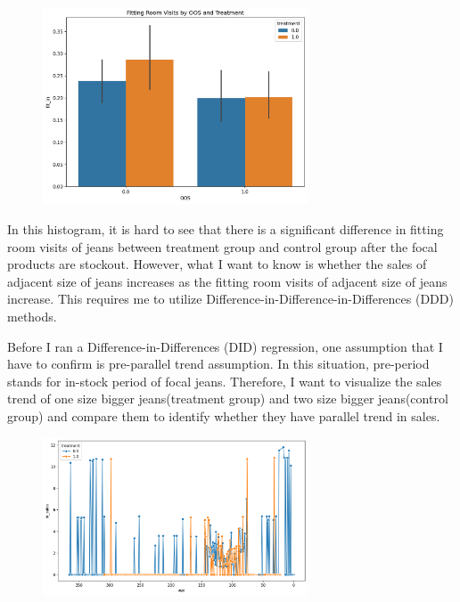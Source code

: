 \documentclass[letterpaper,12pt]{article}
\theoremstyle{definition}
\begin{document}
	\begin{figure}[H]
		\centering
		\includegraphics[width=0.7\textwidth]{images/Fittingroomvisits.png}
		\caption{}
		\label{Fittingroom visits}
	\end{figure}
	
	In this histogram, it is hard to see that there is a significant difference in fitting room visits of jeans between treatment group and control group after the focal products are stockout. However, what I want to know is whether the sales of adjacent size of jeans increases as the fitting room visits of adjacent size of jeans increase. This requires me to utilize Difference-in-Difference-in-Differences (DDD) methods.
	
	Before I ran a Difference-in-Differences (DID) regression, one assumption that I have to confirm is pre-parallel trend assumption. In this situation, pre-period stands for in-stock period of focal jeans. Therefore, I want to visualize the sales trend of one size bigger jeans(treatment group) and two size bigger jeans(control group) and compare them to identify whether they have parallel trend in sales. 
	
	\begin{figure}[H]
		\centering
		\includegraphics[width=0.7\textwidth]{images/SalesTrend.png}
		\caption{}
		\label{SalesTrend}
	\end{figure}
	
\end{document}
